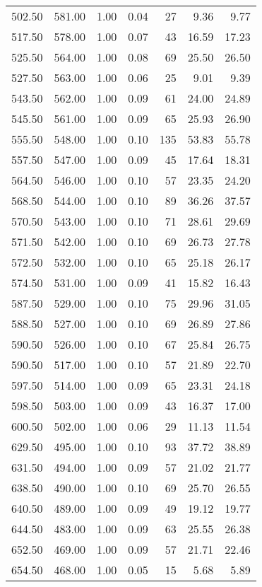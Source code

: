 \begin{table}
\begin{tabular}{rrrrrrr}
502.50 & 581.00 & 1.00 & 0.04 & 27 & 9.36 & 9.77 \\
517.50 & 578.00 & 1.00 & 0.07 & 43 & 16.59 & 17.23 \\
525.50 & 564.00 & 1.00 & 0.08 & 69 & 25.50 & 26.50 \\
527.50 & 563.00 & 1.00 & 0.06 & 25 & 9.01 & 9.39 \\
543.50 & 562.00 & 1.00 & 0.09 & 61 & 24.00 & 24.89 \\
545.50 & 561.00 & 1.00 & 0.09 & 65 & 25.93 & 26.90 \\
555.50 & 548.00 & 1.00 & 0.10 & 135 & 53.83 & 55.78 \\
557.50 & 547.00 & 1.00 & 0.09 & 45 & 17.64 & 18.31 \\
564.50 & 546.00 & 1.00 & 0.10 & 57 & 23.35 & 24.20 \\
568.50 & 544.00 & 1.00 & 0.10 & 89 & 36.26 & 37.57 \\
570.50 & 543.00 & 1.00 & 0.10 & 71 & 28.61 & 29.69 \\
571.50 & 542.00 & 1.00 & 0.10 & 69 & 26.73 & 27.78 \\
572.50 & 532.00 & 1.00 & 0.10 & 65 & 25.18 & 26.17 \\
574.50 & 531.00 & 1.00 & 0.09 & 41 & 15.82 & 16.43 \\
587.50 & 529.00 & 1.00 & 0.10 & 75 & 29.96 & 31.05 \\
588.50 & 527.00 & 1.00 & 0.10 & 69 & 26.89 & 27.86 \\
590.50 & 526.00 & 1.00 & 0.10 & 67 & 25.84 & 26.75 \\
590.50 & 517.00 & 1.00 & 0.10 & 57 & 21.89 & 22.70 \\
597.50 & 514.00 & 1.00 & 0.09 & 65 & 23.31 & 24.18 \\
598.50 & 503.00 & 1.00 & 0.09 & 43 & 16.37 & 17.00 \\
600.50 & 502.00 & 1.00 & 0.06 & 29 & 11.13 & 11.54 \\
629.50 & 495.00 & 1.00 & 0.10 & 93 & 37.72 & 38.89 \\
631.50 & 494.00 & 1.00 & 0.09 & 57 & 21.02 & 21.77 \\
638.50 & 490.00 & 1.00 & 0.10 & 69 & 25.70 & 26.55 \\
640.50 & 489.00 & 1.00 & 0.09 & 49 & 19.12 & 19.77 \\
644.50 & 483.00 & 1.00 & 0.09 & 63 & 25.55 & 26.38 \\
652.50 & 469.00 & 1.00 & 0.09 & 57 & 21.71 & 22.46 \\
654.50 & 468.00 & 1.00 & 0.05 & 15 & 5.68 & 5.89 \\

\end{tabular}
\end{table}
